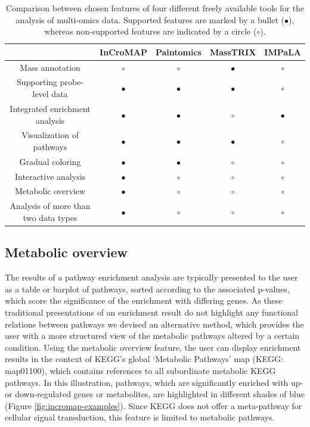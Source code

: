 \documentclass[final,5p,times,twocolumn]{elsarticle}
\newcommand\red[1]{{\color{red}#1}}
\begin{document}
\begin{table}
\center
\caption{\red{Comparison between chosen features of four different freely available tools for the analysis of multi-omics data. Supported features are marked by a bullet ($\bullet$), whereas non-supported features are indicated by a circle ($\circ$).}}
\begin{tabular}{ccccc}
\hline
 & InCroMAP & Paintomics & MassTRIX & IMPaLA\\
\hline
Mass annotation & $\circ$ & $\circ$ & $\bullet$ & $\circ$ \\
Supporting probe-level data & $\bullet$  & $\bullet$  & $\bullet$  & $\circ$ \\
Integrated enrichment analysis & $\bullet$  & $\bullet$ & $\circ$  & $\bullet$  \\
Visualization of pathways & $\bullet$ & $\bullet$ & $\bullet$  & $\circ$\\
Gradual coloring & $\bullet$  & $\bullet$ & $\circ$ & $\circ$\\
Interactive analysis & $\bullet$  & $\circ$ & $\circ$ & $\circ$\\
Metabolic overview  & $\bullet$  & $\circ$ & $\circ$ & $\circ$\\
Analysis of more than two data types & $\bullet$  & $\circ$ & $\circ$ & $\circ$ \\
\hline
\end{tabular}
\label{tab:incromap-comparison}
\end{table}

\subsection{Metabolic overview}
The results of a pathway enrichment analysis are typically presented to the user as a table or barplot of pathways, sorted according to the associated p-values, which score the significance of the enrichment with differing genes. As these traditional presentations of an enrichment result do not highlight any functional relations between pathways we devised an alternative method, which provides the user with a more structured view of the metabolic pathways altered by a certain condition. Using the metabolic overview feature, the user can display enrichment results in the context of KEGG's global `Metabolic Pathways' map (KEGG: map01100), which contains references to all subordinate metabolic KEGG pathways. In this illustration, pathways, which are significantly enriched with up- or down-regulated genes or metabolites, are highlighted in different shades of blue (Figure \ref{fig:incromap-examples}). Since KEGG does not offer a meta-pathway for cellular signal transduction, this feature is limited to metabolic pathways. 
\end{document}
